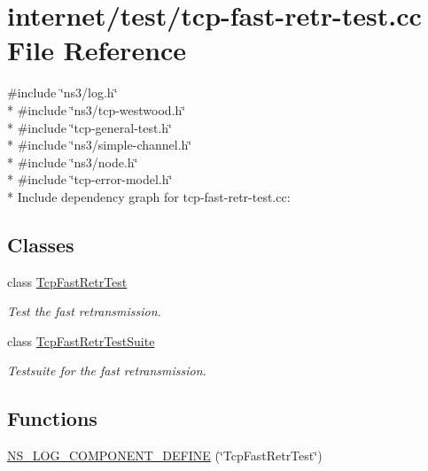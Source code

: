 \hypertarget{tcp-fast-retr-test_8cc}{}\section{internet/test/tcp-\/fast-\/retr-\/test.cc File Reference}
\label{tcp-fast-retr-test_8cc}
{\ttfamily \#include \char`\"{}ns3/log.\+h\char`\"{}}\\*
{\ttfamily \#include \char`\"{}ns3/tcp-\/westwood.\+h\char`\"{}}\\*
{\ttfamily \#include \char`\"{}tcp-\/general-\/test.\+h\char`\"{}}\\*
{\ttfamily \#include \char`\"{}ns3/simple-\/channel.\+h\char`\"{}}\\*
{\ttfamily \#include \char`\"{}ns3/node.\+h\char`\"{}}\\*
{\ttfamily \#include \char`\"{}tcp-\/error-\/model.\+h\char`\"{}}\\*
Include dependency graph for tcp-\/fast-\/retr-\/test.cc\+:
\subsection*{Classes}
\begin{DoxyCompactItemize}
\item 
class \hyperlink{classTcpFastRetrTest}{Tcp\+Fast\+Retr\+Test}
\begin{DoxyCompactList}\small\item\em Test the fast retransmission. \end{DoxyCompactList}\item 
class \hyperlink{classTcpFastRetrTestSuite}{Tcp\+Fast\+Retr\+Test\+Suite}
\begin{DoxyCompactList}\small\item\em Testsuite for the fast retransmission. \end{DoxyCompactList}\end{DoxyCompactItemize}
\subsection*{Functions}
\begin{DoxyCompactItemize}
\item 
\hyperlink{tcp-fast-retr-test_8cc_a17352b605c7f9fc55c6bfff8110d7bca}{N\+S\+\_\+\+L\+O\+G\+\_\+\+C\+O\+M\+P\+O\+N\+E\+N\+T\+\_\+\+D\+E\+F\+I\+NE} (\char`\"{}Tcp\+Fast\+Retr\+Test\char`\"{})
\end{DoxyCompactItemize}
